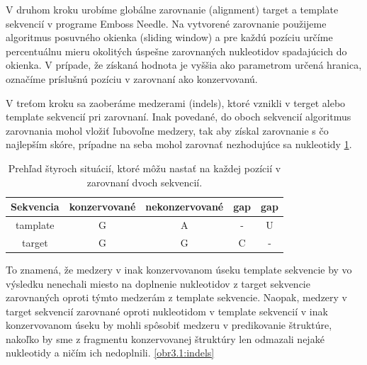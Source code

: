 \indent V druhom kroku urobíme globálne zarovnanie (alignment) target a template sekvencií v programe Emboss Needle. Na vytvorené zarovnanie použijeme algoritmus posuvného okienka (sliding window) a pre každú pozíciu určíme percentuálnu mieru okolitých úspešne zarovnaných nukleotidov spadajúcich do okienka. V prípade, že získaná hodnota je vyššia ako parametrom určená hranica, označíme príslušnú pozíciu v zarovnaní ako konzervovanú. 


\indent V treťom kroku sa zaoberáme medzerami (indels), ktoré vznikli v terget alebo template sekvencií pri zarovnaní. Inak povedané, do oboch sekvencií algoritmus zarovnania mohol vložiť ľubovoľne medzery, tak aby získal zarovnanie s čo najlepším skóre, prípadne na seba mohol zarovnať nezhodujúce sa nukleotidy \ref{tab3.1}. 

\begin{table}[b!]
\centering
\begin{tabular}{ccccc}
\toprule
Sekvencia  & konzervované  & nekonzervované & gap & gap \\
\midrule
tamplate  & G  & A & - & U \\
target  & G  & G & C & - \\
\bottomrule
\end{tabular}
\caption{Prehľad štyroch situácií, ktoré môžu nastať na každej pozícií v zarovnaní dvoch sekvencií.}\label{tab3.1}
\end{table}

To znamená, že medzery v inak konzervovanom úseku template sekvencie by vo výsledku nenechali miesto na doplnenie nukleotidov z target sekvencie zarovnaných oproti týmto medzerám z template sekvencie. 
Naopak, medzery v target sekvencií zarovnané oproti nukleotidom v template sekvencií v inak konzervovanom úseku by mohli spôsobiť medzeru v predikovanie štruktúre, nakoľko by sme z fragmentu konzervovanej štruktúry len odmazali nejaké nukleotidy a ničím ich nedoplnili. \ref{obr3.1:indels}


